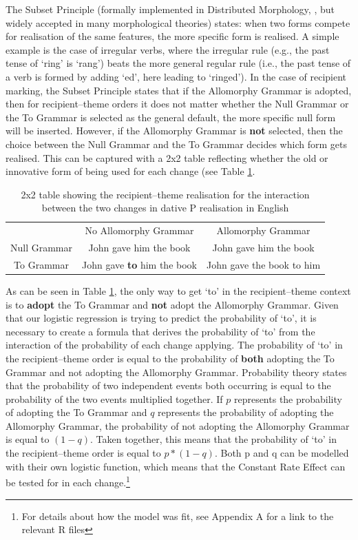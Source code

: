 	The Subset Principle (formally implemented in Distributed Morphology, \citealt{Halle.1993}, but widely accepted in many morphological theories) states: when two forms compete for realisation of the same features, the more specific form is realised. A simple example is the case of irregular verbs, where the irregular rule (e.g., the past tense of `ring' is `rang') beats the more general regular rule (i.e., the past tense of a verb is formed by adding `ed', here leading to `ringed'). In the case of recipient marking, the Subset Principle states that if the Allomorphy Grammar is adopted, then for recipient--theme orders it does not matter whether the Null Grammar or the To Grammar is selected as the general default, the more specific null form will be inserted. However, if the Allomorphy Grammar is \textbf{not} selected, then the choice between the Null Grammar and the To Grammar decides which form gets realised. This can be captured with a 2x2 table reflecting whether the old or innovative form of being used for each change (see Table \ref{tab:2x2int}.


	\begin{table}
		\begin{tabular}{ccc}
					& No Allomorphy Grammar & Allomorphy Grammar\\
			Null Grammar	& John gave him the book & John gave him the book\\
			To Grammar	& John gave \textbf{to} him the book & John gave the book to him\\
		\end{tabular}
		\caption{2x2 table showing the recipient--theme realisation for the interaction between the two changes in dative P realisation in English}
		\label{tab:2x2int}
	\end{table}

	As can be seen in Table \ref{tab:2x2int}, the only way to get `to' in the recipient--theme context is to \textbf{adopt} the To Grammar and \textbf{not} adopt the Allomorphy Grammar. Given that our logistic regression is trying to predict the probability of `to', it is necessary to create a formula that derives the probability of `to' from the interaction of the probability of each change applying. The probability of `to' in the recipient--theme order is equal to the probability of \textbf{both} adopting the To Grammar and not adopting the Allomorphy Grammar. Probability theory states that the probability of two independent events both occurring is equal to the probability of the two events multiplied together. If $p$ represents the probability of adopting the To Grammar and $q$ represents the probability of adopting the Allomorphy Grammar, the probability of not adopting the Allomorphy Grammar is equal to $(1-q)$. Taken together, this means that the probability of `to' in the recipient--theme order is equal to $p * (1-q)$. Both p and q can be modelled with their own logistic function, which means that the Constant Rate Effect can be tested for in each change.\footnote{For details about how the model was fit, see Appendix A for a link to the relevant R files}

